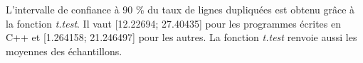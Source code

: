 L'intervalle de confiance à 90 \% du taux de lignes dupliquées est
obtenu grâce à la fonction \emph{t.test}. Il vaut [12.22694; 27.40435]
pour les programmes écrites en C++ et [1.264158; 21.246497] pour les
autres. La fonction \emph{t.test} renvoie aussi les moyennes des
échantillons.

